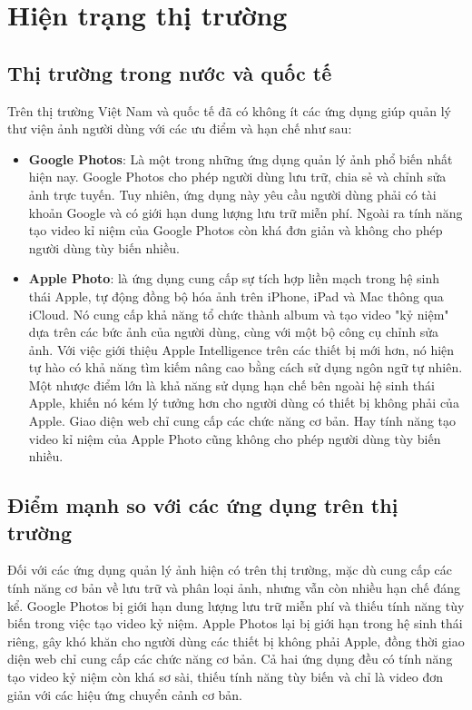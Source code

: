 \section{Hiện trạng thị trường}
\subsection{Thị trường trong nước và quốc tế}
Trên thị trường Việt Nam và quốc tế đã có không ít các ứng dụng giúp quản lý thư viện ảnh người dùng với các ưu điểm và hạn chế như sau:
\begin{itemize}
    \item \textbf{Google Photos}: Là một trong những ứng dụng quản lý ảnh phổ biến nhất hiện nay. Google Photos cho phép người dùng lưu trữ, chia sẻ và chỉnh sửa ảnh trực tuyến. Tuy nhiên, ứng dụng này yêu cầu người dùng phải có tài khoản Google và có giới hạn dung lượng lưu trữ miễn phí. Ngoài ra tính năng tạo video kỉ niệm của Google Photos còn khá đơn giản và không cho phép người dùng tùy biến nhiều.
    \item \textbf{Apple Photo}: là ứng dụng cung cấp sự tích hợp liền mạch trong hệ sinh thái Apple, tự động đồng bộ hóa ảnh trên iPhone, iPad và Mac thông qua iCloud. Nó cung cấp khả năng tổ chức thành album và tạo video "kỷ niệm" dựa trên các bức ảnh của người dùng, cùng với một bộ công cụ chỉnh sửa ảnh. Với việc giới thiệu Apple Intelligence trên các thiết bị mới hơn, nó hiện tự hào có khả năng tìm kiếm nâng cao bằng cách sử dụng ngôn ngữ tự nhiên. Một nhược điểm lớn là khả năng sử dụng hạn chế bên ngoài hệ sinh thái Apple, khiến nó kém lý tưởng hơn cho người dùng có thiết bị không phải của Apple. Giao diện web chỉ cung cấp các chức năng cơ bản. Hay tính năng tạo video kỉ niệm của Apple Photo cũng không cho phép người dùng tùy biến nhiều.
\end{itemize}

\subsection{Điểm mạnh so với các ứng dụng trên thị trường}
Đối với các ứng dụng quản lý ảnh hiện có trên thị trường, mặc dù cung cấp các tính năng cơ bản về lưu trữ và phân loại ảnh, nhưng vẫn còn nhiều hạn chế đáng kể. Google Photos bị giới hạn dung lượng lưu trữ miễn phí và thiếu tính năng tùy biến trong việc tạo video kỷ niệm. Apple Photos lại bị giới hạn trong hệ sinh thái riêng, gây khó khăn cho người dùng các thiết bị không phải Apple, đồng thời giao diện web chỉ cung cấp các chức năng cơ bản. Cả hai ứng dụng đều có tính năng tạo video kỷ niệm còn khá sơ sài, thiếu tính năng tùy biến và chỉ là video đơn giản với các hiệu ứng chuyển cảnh cơ bản.


